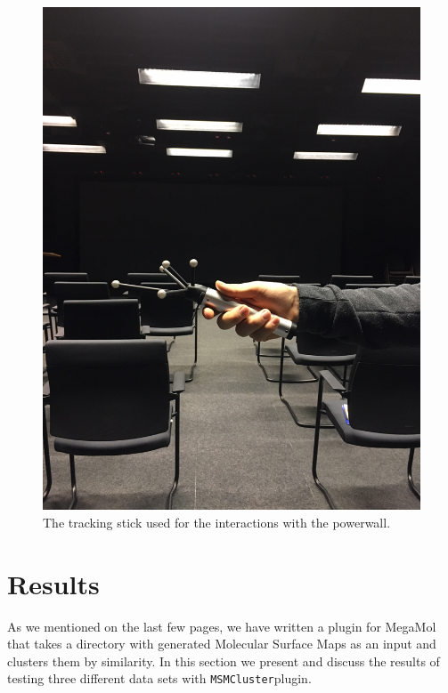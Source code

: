 \documentclass[journal]{vgtc}       %
\begin{document}
\begin{figure}[t]
	\begin{center}
		\includegraphics[angle=270, width= \linewidth]{image2.jpeg}
	\end{center}
	\caption{\label{fig:tracking} The tracking stick used for the interactions with the powerwall. }
\end{figure}




\section{Results}\label{sec:results}
As we mentioned on the last few pages, we have written a plugin for MegaMol that takes a directory with generated Molecular Surface Maps as an input and clusters  them by similarity. In this section we present and discuss the results of testing three different data sets with \verb|MSMCluster|plugin. 
\end{document}
